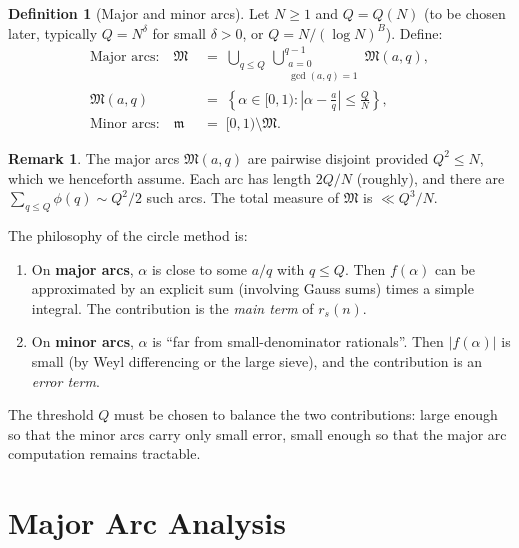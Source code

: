\documentclass[12pt,a4paper]{amsart}
\theoremstyle{definition}
\newtheorem{definition}[theorem]{Definition}
\newtheorem{remark}[theorem]{Remark}
\begin{document}
\begin{definition}[Major and minor arcs]\label{def:arcs}
  Let $N \geq 1$ and $Q = Q(N)$ (to be chosen later, typically
  $Q = N^\delta$ for small $\delta > 0$, or $Q = N / (\log N)^B$).
  Define:
  \begin{align*}
    \text{Major arcs:} \quad
    \mathfrak{M} &\;=\; \bigcup_{q \leq Q}\, \bigcup_{\substack{a=0\\ \gcd(a,q)=1}}^{q-1}
                         \mathfrak{M}(a, q), \\[4pt]
    \mathfrak{M}(a, q) &\;=\; \left\{\alpha \in [0,1) :
      \left|\alpha - \frac{a}{q}\right| \leq \frac{Q}{N}\right\}, \\[4pt]
    \text{Minor arcs:} \quad
    \mathfrak{m} &\;=\; [0,1) \setminus \mathfrak{M}.
  \end{align*}
\end{definition}

\begin{remark}
  The major arcs $\mathfrak{M}(a,q)$ are pairwise disjoint provided
  $Q^2 \leq N$, which we henceforth assume.  Each arc has length
  $2Q/N$ (roughly), and there are $\sum_{q \leq Q} \phi(q) \sim Q^2/2$
  such arcs.  The total measure of $\mathfrak{M}$ is $\ll Q^3/N$.
\end{remark}

The philosophy of the circle method is:
\begin{enumerate}
  \item On \textbf{major arcs}, $\alpha$ is close to some $a/q$ with
    $q \leq Q$.  Then $f(\alpha)$ can be approximated by an explicit
    sum (involving Gauss sums) times a simple integral.  The
    contribution is the \emph{main term} of $r_s(n)$.
  \item On \textbf{minor arcs}, $\alpha$ is ``far from small-denominator
    rationals''.  Then $|f(\alpha)|$ is small (by Weyl differencing or
    the large sieve), and the contribution is an \emph{error term}.
\end{enumerate}

The threshold $Q$ must be chosen to balance the two contributions:
large enough so that the minor arcs carry only small error, small enough
so that the major arc computation remains tractable.

\section{Major Arc Analysis}
\label{sec:major}
\end{document}
